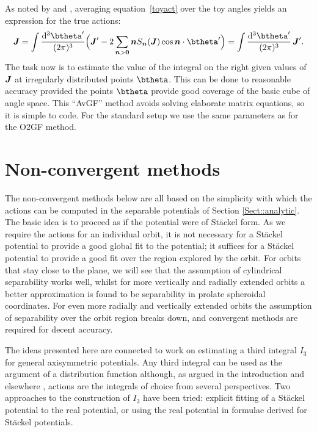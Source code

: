 \documentclass[useAMS,usenatbib,fleqn,a4paper]{mn2e}
\newcommand{\bs}[1]{\bmath{#1}}
\begin{document}
As noted by \cite{Bovy2014} and \cite{Fox2014}, averaging
equation~\eqref{toyact} over the toy angles yields an expression for the
true actions:
\begin{equation}
\bs{J}=\int{\mathrm{d}^3\btheta'\over(2\pi)^3}
\Big(\boldsymbol{J}'-2\sum_{\bs{n}>\bs{0}}\bs{n}S_{\bs{n}}(\bs{J})\cos\bs{n}\cdot\btheta'\Big)
=\int{\mathrm{d}^3\btheta'\over(2\pi)^3}\,\boldsymbol{J}'.
\end{equation}
 The task now is to estimate the value of the integral on the right given values
of $\bs{J}$ at irregularly distributed points $\btheta$. This can be done to
reasonable accuracy provided the points $\btheta$ provide good coverage of
the basic cube of angle space. This ``AvGF'' method avoids solving elaborate matrix
equations, so it is simple to code. For the standard setup we use the same
parameters as for the O2GF method.

\section{Non-convergent methods}\label{Sect::MethodsNC}

The non-convergent methods below are all based on the simplicity with
which the actions can be computed in the separable potentials of
Section \ref{Sect::analytic}. The basic idea is to proceed as if the potential were of St\"ackel
form. As we require the actions for an individual orbit, it is not necessary
for a St\"ackel potential to provide a good global fit to the potential; it
suffices for a St\"ackel potential to provide a good fit over the region
explored by the orbit. For orbits that stay close to the plane, we will see that the
assumption of cylindrical separability works well, whilst for more vertically
and radially extended orbits a better approximation is found to be
separability in prolate spheroidal coordinates.  For even more radially and
vertically extended orbits the assumption of separability over the orbit
region breaks down, and convergent methods are required for decent accuracy.

The ideas presented here are connected to work on estimating a third
integral $I_3$ for general axisymmetric potentials. Any third integral can be
used as the argument of a distribution function although, as argued in the
introduction and elsewhere \citep[e.g.][]{BinneyMcMillan2015}, actions are
the integrals of choice from several perspectives. Two approaches to the
construction of $I_3$ have been tried: explicit fitting of a St\"ackel
potential to the real potential, or using the real potential in formulae
derived for St\"ackel potentials.
\end{document}

